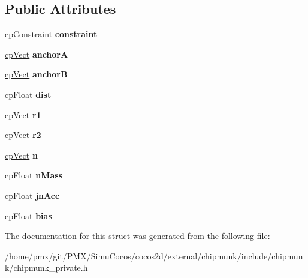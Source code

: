 \subsection*{Public Attributes}
\begin{DoxyCompactItemize}
\item 
\mbox{\label{structcpPinJoint_a22271b24382dc0f3c3252b920f5ea2b0}} 
\hyperlink{structcpConstraint}{cp\+Constraint} {\bfseries constraint}
\item 
\mbox{\label{structcpPinJoint_a8323f431e3a4ff0d9267ed909dada92f}} 
\hyperlink{structcpVect}{cp\+Vect} {\bfseries anchorA}
\item 
\mbox{\label{structcpPinJoint_a11e90db9a11f6dd63d49639f87ff93cd}} 
\hyperlink{structcpVect}{cp\+Vect} {\bfseries anchorB}
\item 
\mbox{\label{structcpPinJoint_a045d7f0e20e7cb35121063026712cdf0}} 
cp\+Float {\bfseries dist}
\item 
\mbox{\label{structcpPinJoint_a5cd074b422532afc76c1d2b47e755543}} 
\hyperlink{structcpVect}{cp\+Vect} {\bfseries r1}
\item 
\mbox{\label{structcpPinJoint_a82dbd85f7f012228dd51c1c6b9b5b661}} 
\hyperlink{structcpVect}{cp\+Vect} {\bfseries r2}
\item 
\mbox{\label{structcpPinJoint_a7bc2a4109fa4ec19e857bc7eff57701a}} 
\hyperlink{structcpVect}{cp\+Vect} {\bfseries n}
\item 
\mbox{\label{structcpPinJoint_a6e13d4ba204e4421d1264737913d68c4}} 
cp\+Float {\bfseries n\+Mass}
\item 
\mbox{\label{structcpPinJoint_abbb714ec340b9fc5e7d9fbd9530b8f46}} 
cp\+Float {\bfseries jn\+Acc}
\item 
\mbox{\label{structcpPinJoint_a3344a217c5313f65db0b4fb773d7ea11}} 
cp\+Float {\bfseries bias}
\end{DoxyCompactItemize}


The documentation for this struct was generated from the following file\+:\begin{DoxyCompactItemize}
\item 
/home/pmx/git/\+P\+M\+X/\+Simu\+Cocos/cocos2d/external/chipmunk/include/chipmunk/chipmunk\+\_\+private.\+h\end{DoxyCompactItemize}

